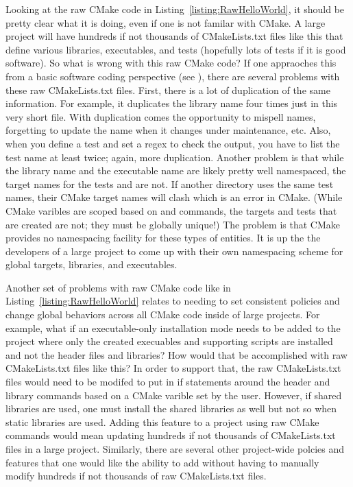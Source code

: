 \documentclass[note]{TechNote}
\begin{document}
Looking at the raw CMake code in Listing~\ref{listing:RawHelloWorld}, it should be pretty clear what it is doing, even if one is not familar with CMake.  A large project will have hundreds if not thousands of CMakeLists.txt files like this that define various libraries, executables, and tests (hopefully lots of tests if it is good software).  So what is wrong with this raw CMake code?  If one appraoches this from a basic software coding perspective (see \cite{CodeComplete2nd04}), there are several problems with these raw CMakeLists.txt files.  First, there is a lot of duplication of the same information.  For example, it duplicates the library name  four times just in this very short file.  With duplication comes the opportunity to mispell names, forgetting to update the name when it changes under maintenance, etc.  Also, when you define a test and set a regex to check the output, you have to list the test name at least twice; again, more duplication.  Another problem is that while the library name  and the executable name  are likely pretty well namespaced, the target names for the tests  and  are not.  If another directory uses the same test names, their CMake target names will clash which is an error in CMake.  (While CMake varibles are scoped based on  and  commands, the targets and tests that are created are not; they must be globally unique!)  The problem is that CMake provides no namespacing facility for these types of entities.  It is up the the developers of a large project to come up with their own namespacing scheme for global targets, libraries, and executables.

Another set of problems with raw CMake code like in Listing~\ref{listing:RawHelloWorld} relates to needing to set consistent policies and change global behaviors across all CMake code inside of large projects.  For example, what if an executable-only installation mode needs to be added to the project where only the created execuables and supporting scripts are installed and not the header files and libraries?  How would that be accomplished with raw CMakeLists.txt files like this?  In order to support that, the raw CMakeLists.txt files would need to be modifed to put in if statements around the header and library  commands based on a CMake varible set by the user.  However, if shared libraries are used, one must install the shared libraries as well but not so when static libraries are used.  Adding this feature to a project using raw CMake commands would mean updating hundreds if not thousands of CMakeLists.txt files in a large project.  Similarly, there are several other project-wide polcies and features that one would like the ability to add without having to manually modify hundreds if not thousands of raw CMakeLists.txt files.
\end{document}
